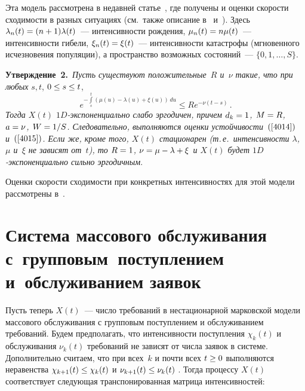 \begin{multicols}{2}
Эта модель рассмотрена в недавней статье~\cite{z13a},
где получены и оценки скорости сходимости в разных ситуациях
(см.\ также описание в~\cite{tkf} и~\cite{mb}).
Здесь $\lambda_n(t)\hm=(n\hm+1)\lambda(t)$~--- интенсивности рождения,
$\mu_n(t)\hm=n\mu(t)$~--- интенсивности гибели,
$\xi_{n}(t)\hm=\xi(t)$~--- интенсивности катастрофы (мгновенного
исчезновения популяции), а пространство возможных состояний~--- $\{0, 1, \dots,S \}$.

\smallskip

\noindent
\textbf{Утверждение~2.}\
\textit{Пусть существуют положительные~$R$ и~$\nu$ такие, что при любых }
$s,t$, $0\hm \le s\hm \le t$,
\begin{equation*}
e^{-\int\limits_s^t\left(\mu(u)-\lambda(u)+\xi(u)\right)\, du} \le R e^{-\nu (t-s)}\,.
\end{equation*}
  \textit{Тогда $X(t)$ $1D$-экс\-по\-нен\-ци\-аль\-но слабо эргодичен,
  причем $d_k\hm= 1$, $M\hm=R$, $ a\hm = \nu$, $W\hm= {1}/{S}$.
  Следовательно, выполняются оценки устой\-чи\-вости~$(\ref{4014})$ и~$(\ref{4015})$.
Если же, кроме того,  $X(t)$ стационарен (т.\,е.\ ин\-тен\-сив\-ности $\lambda$, $\mu$ и~$\xi$
не зависят от~$t$), то $R\hm=1$, $\nu \hm= \mu\hm-\lambda\hm+\xi$ и
$X(t)$ будет $1D$-экс\-по\-нен\-ци\-аль\-но сильно эргодичным}.


Оценки скорости сходимости при конкретных интенсивностях для этой модели
рас\-смот\-ре\-ны в~\cite{z13a}.

\vspace*{-4pt}


\section{Система массового обслуживания с~групповым~поступлением и~обслуживанием заявок}

Пусть теперь  $X(t)$~--- число требований в нестационарной марковской модели массового обслуживания
с групповым поступлением и обслуживанием требований. Будем предполагать, что интенсивности поступления
 $\chi_{k}(t)$ и обслуживания $\nu_{k}(t)$  требований не зависят от чис\-ла заявок в системе.
 Дополнительно считаем, что при всех~$k$ и почти всех  $t \hm\ge 0$  выполняются неравенства
 $\chi_{k+1}(t)\hm \le \chi_{k}(t)$ и $\nu_{k+1}(t)\hm \le \nu_{k}(t)$ .
Тогда процессу $X(t)$ соответствует следующая транспонированная матрица интенсивностей:


\end{multicols}
